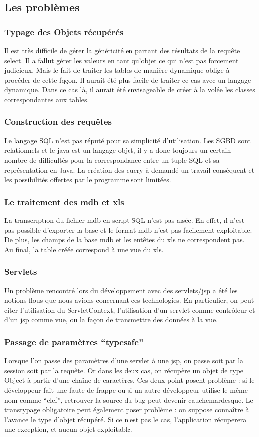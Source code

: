 \subsection{Les problèmes}
\subsubsection{Typage des Objets récupérés}
Il est très difficile de gérer la généricité en partant des résultats de la requête select. Il a fallut gérer les valeurs en tant qu'objet ce qui n'est pas forcement judicieux. Mais le fait de traiter les tables de manière dynamique oblige à procéder de cette fqçon. Il aurait été plus facile de traiter ce cas avec un langage dynamique. Dans ce cas là, il aurait été envisageable de créer à la volée les classes correspondantes aux tables.
\subsubsection{Construction des requêtes}
Le langage SQL n'est pas réputé pour sa simplicité d'utilisation. Les SGBD sont relationnels et le java est un langage objet, il y a donc toujours un certain nombre de difficultés pour la correspondance entre un tuple SQL et sa représentation en Java. La création des query à demandé un travail conséquent et les possibilités offertes par le programme sont limitées.
\subsubsection{Le traitement des mdb et xls}
La transcription du fichier mdb en script SQL n'est pas aisée. En effet, il n'est pas possible d'exporter la base et le format mdb n'est pas facilement exploitable. De plus, les champs de la base mdb et les entêtes du xls ne correspondent pas. Au final, la table créée correspond à une vue du xls.

\subsubsection{Servlets}
Un problème rencontré lors du développement avec des servlets/jsp a été les notions flous que nous avions concernant ces technologies. En particulier, on peut citer l'utilisation du ServletContext, l'utilisation d'un servlet comme contrôleur et d'un jsp comme vue, ou la façon de transmettre des données à la vue.

\subsubsection{Passage de paramètres ``typesafe''}
Lorsque l'on passe des paramètres d'une servlet à une jsp, on passe soit par la session soit par la requête. Or dans les deux cas, on récupère un objet de type Object à partir d'une chaîne de caractères. Ces deux point posent problème : si le développeur fait une faute de frappe ou si un autre développeur utilise le même nom comme ``clef'', retrouver la source du bug peut devenir cauchemardesque. Le transtypage obligatoire peut également poser problème : on suppose connaître à l'avance le type d'objet récupéré. Si ce n'est pas le cas, l'application récuperera une exception, et aucun objet exploitable.

